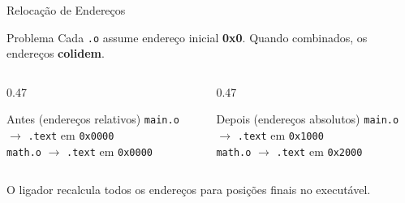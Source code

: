 \documentclass[aspectratio=169, 11pt]{beamer}
\begin{document}
\begin{frame}{Relocação de Endereços}
  \begin{block}{Problema}
    Cada \texttt{.o} assume endereço inicial \textbf{0x0}.
    Quando combinados, os endereços \textbf{colidem}.
  \end{block}
  \vspace{0.3cm}
  \begin{columns}[T]
    \begin{column}{0.47\textwidth}
      \begin{exampleblock}{Antes \normalfont(endereços relativos)}
        \texttt{main.o} \; $\rightarrow$ \texttt{.text} em \texttt{0x0000}\\
        \texttt{math.o} \; $\rightarrow$ \texttt{.text} em \texttt{0x0000}
      \end{exampleblock}
    \end{column}
    \begin{column}{0.47\textwidth}
      \begin{block}{Depois \normalfont(endereços absolutos)}
        \texttt{main.o} \; $\rightarrow$ \texttt{.text} em \texttt{0x1000}\\
        \texttt{math.o} \; $\rightarrow$ \texttt{.text} em \texttt{0x2000}
      \end{block}
    \end{column}
  \end{columns}
  \vspace{0.4cm}
  \begin{center}
    O ligador \alert{recalcula} todos os endereços para posições finais no executável.
  \end{center}
\end{frame}
\end{document}
